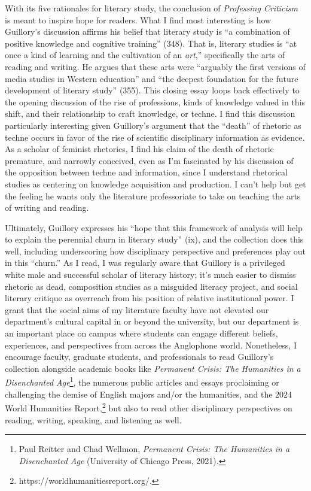 \documentclass{tufte-handout}
\begin{document}
With its five rationales for literary study, the conclusion of
\emph{Professing Criticism} is meant to inspire hope for readers. What I
find most interesting is how Guillory's discussion affirms his belief
that literary study is ``a combination of positive knowledge and
cognitive training'' (348). That is, literary studies is ``at once a
kind of learning and the cultivation of an \emph{art},'' specifically
the arts of reading and writing. He argues that these arts were
``arguably the first versions of media studies in Western education''
and ``the deepest foundation for the future development of literary
study'' (355). This closing essay loops back effectively to the opening
discussion of the rise of professions, kinds of knowledge valued in this
shift, and their relationship to craft knowledge, or techne. I find this
discussion particularly interesting given Guillory's argument that the
``death'' of rhetoric as techne occurs in favor of the rise of
scientific disciplinary information as evidence. As a scholar of
feminist rhetorics, I find his claim of the death of rhetoric premature,
and narrowly conceived, even as I'm fascinated by his discussion of the
opposition between techne and information, since I understand rhetorical
studies as centering on knowledge acquisition and production. I can't
help but get the feeling he wants only the literature professoriate to
take on teaching the arts of writing and reading.

Ultimately, Guillory expresses his ``hope that this framework of
analysis will help to explain the perennial churn in literary study''
(ix), and the collection does this well, including underscoring how
disciplinary perspective and preferences play out in this ``churn.'' As
I read, I was regularly aware that Guillory is a privileged white male
and successful scholar of literary history; it's much easier to dismiss
rhetoric as dead, composition studies as a misguided literacy project,
and social literary critique as overreach from his position of relative
institutional power. I grant that the social aims of my literature
faculty have not elevated our department's cultural capital in or beyond
the university, but our department is an important place on campus where
students can engage different beliefs, experiences, and perspectives
from across the Anglophone world. Nonetheless, I encourage faculty,
graduate students, and professionals to read Guillory's collection
alongside academic books like \emph{Permanent Crisis: The Humanities in
a Disenchanted Age}\footnote{Paul Reitter and Chad Wellmon,
  \emph{Permanent Crisis: The Humanities in a Disenchanted Age}
  (University of Chicago Press, 2021).}, the numerous public articles
and essays proclaiming or challenging the demise of English majors
and/or the humanities, and the 2024 World Humanities Report,\footnote{https://worldhumanitiesreport.org/.}
but also to read other disciplinary perspectives on reading, writing,
speaking, and listening as well.
\end{document}
